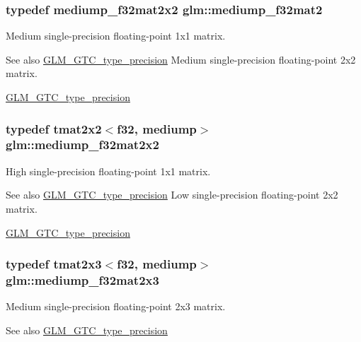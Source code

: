 \subsubsection[{mediump\+\_\+f32mat2}]{\setlength{\rightskip}{0pt plus 5cm}typedef {\bf mediump\+\_\+f32mat2x2} {\bf glm\+::mediump\+\_\+f32mat2}}\label{namespaceglm_a103735a38477f7c389b36aae0fbdf274}
Medium single-\/precision floating-\/point 1x1 matrix. \begin{DoxySeeAlso}{See also}
\hyperlink{group__gtc__type__precision}{G\+L\+M\+\_\+\+G\+T\+C\+\_\+type\+\_\+precision} Medium single-\/precision floating-\/point 2x2 matrix. 

\hyperlink{group__gtc__type__precision}{G\+L\+M\+\_\+\+G\+T\+C\+\_\+type\+\_\+precision} 
\end{DoxySeeAlso}
\hypertarget{namespaceglm_a4b54e9273e523b0e07e5a0c92eb1ff9e}{}
\subsubsection[{mediump\+\_\+f32mat2x2}]{\setlength{\rightskip}{0pt plus 5cm}typedef tmat2x2$<${\bf f32}, mediump$>$ {\bf glm\+::mediump\+\_\+f32mat2x2}}\label{namespaceglm_a4b54e9273e523b0e07e5a0c92eb1ff9e}
High single-\/precision floating-\/point 1x1 matrix. \begin{DoxySeeAlso}{See also}
\hyperlink{group__gtc__type__precision}{G\+L\+M\+\_\+\+G\+T\+C\+\_\+type\+\_\+precision} Low single-\/precision floating-\/point 2x2 matrix. 

\hyperlink{group__gtc__type__precision}{G\+L\+M\+\_\+\+G\+T\+C\+\_\+type\+\_\+precision} 
\end{DoxySeeAlso}
\hypertarget{namespaceglm_a87464ba37fbed57b91088eef6ddf4df9}{}
\subsubsection[{mediump\+\_\+f32mat2x3}]{\setlength{\rightskip}{0pt plus 5cm}typedef tmat2x3$<${\bf f32}, mediump$>$ {\bf glm\+::mediump\+\_\+f32mat2x3}}\label{namespaceglm_a87464ba37fbed57b91088eef6ddf4df9}
Medium single-\/precision floating-\/point 2x3 matrix. \begin{DoxySeeAlso}{See also}
\hyperlink{group__gtc__type__precision}{G\+L\+M\+\_\+\+G\+T\+C\+\_\+type\+\_\+precision} 
\end{DoxySeeAlso}
\hypertarget{namespaceglm_ad26c2567ad37745ea5535bb0f312e254}{}
